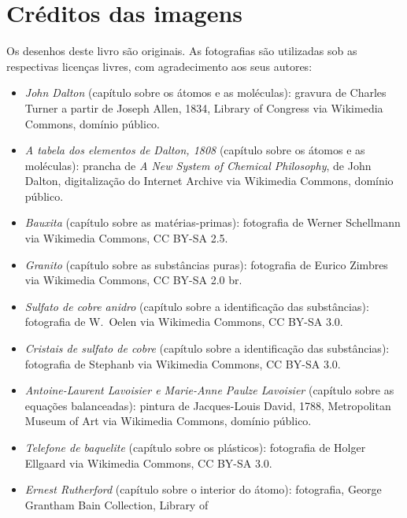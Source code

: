 \chapter*{Créditos das imagens}

Os desenhos deste livro são originais. As fotografias são utilizadas
sob as respectivas licenças livres, com agradecimento aos seus autores:

\begin{itemize}
  \item \emph{John Dalton} (capítulo sobre os átomos e as moléculas):
        gravura de Charles Turner a partir de Joseph Allen, 1834,
        Library of Congress via Wikimedia Commons, domínio público.
  \item \emph{A tabela dos elementos de Dalton, 1808} (capítulo sobre
        os átomos e as moléculas): prancha de \emph{A New System of
        Chemical Philosophy}, de John Dalton, digitalização do Internet
        Archive via Wikimedia Commons, domínio público.
  \item \emph{Bauxita} (capítulo sobre as matérias-primas): fotografia
        de Werner Schellmann via Wikimedia Commons, CC BY-SA 2.5.
  \item \emph{Granito} (capítulo sobre as substâncias puras):
        fotografia de Eurico Zimbres via Wikimedia Commons,
        CC BY-SA 2.0 br.
  \item \emph{Sulfato de cobre anidro} (capítulo sobre a identificação
        das substâncias): fotografia de W.~Oelen via Wikimedia Commons,
        CC BY-SA 3.0.
  \item \emph{Cristais de sulfato de cobre} (capítulo sobre a
        identificação das substâncias): fotografia de Stephanb via
        Wikimedia Commons, CC BY-SA 3.0.
  \item \emph{Antoine-Laurent Lavoisier e Marie-Anne Paulze Lavoisier}
        (capítulo sobre as equações balanceadas): pintura de
        Jacques-Louis David, 1788, Metropolitan Museum of Art via
        Wikimedia Commons, domínio público.
  \item \emph{Telefone de baquelite} (capítulo sobre os plásticos):
        fotografia de Holger Ellgaard via Wikimedia Commons,
        CC BY-SA 3.0.
  \item \emph{Ernest Rutherford} (capítulo sobre o interior do átomo):
        fotografia, George Grantham Bain Collection, Library of

\end{itemize}
